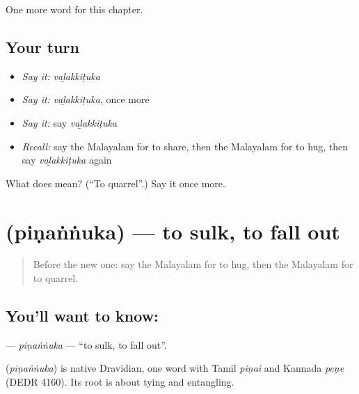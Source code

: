 \begin{grammarlens}[title={What you've built}]
One more word for this chapter.
\end{grammarlens}

\subsection*{Your turn}
\begin{itemize}
\raggedright
  \item \emph{Say it:} \emph{vaḻakkiṭuka}
  \item \emph{Say it:} \emph{vaḻakkiṭuka}, once more
  \item \emph{Say it:} say \emph{vaḻakkiṭuka}
  \item \emph{Recall:} say the Malayalam for to share, then the Malayalam for to hug, then say \emph{vaḻakkiṭuka} again
\end{itemize}

\begin{tcolorbox}[breakable,colback=teal!4,colframe=teal!35!black,title={Before you move on}]
What does  mean? (\textquotedblleft{}To quarrel\textquotedblright{}.) Say it once more.
\end{tcolorbox}
\section[\texorpdfstring{\ml{പിണങ്ങുക} (piṇaṅṅuka)}{പിണങ്ങുക (piṇaṅṅuka)}]{ (piṇaṅṅuka) — to sulk, to fall out}

\label{lesson:ML-C186-pinannuka}



\begin{quote}
Before the new one: say the Malayalam for to hug, then the Malayalam for to quarrel.
\end{quote}

\subsection*{You'll want to know: }
\textbf{} — \emph{piṇaṅṅuka} — \textquotedblleft{}to sulk, to fall out\textquotedblright{}.

\begin{cousinweb}
\textbf{} (\emph{piṇaṅṅuka}) is native Dravidian, one word with Tamil \emph{piṇai} and Kannada \emph{peṇe} (DEDR 4160). Its root is about tying and entangling.
\end{cousinweb}

